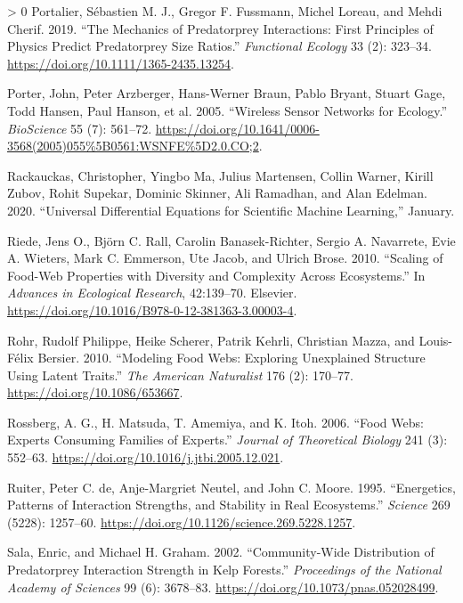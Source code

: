 \documentclass[10pt,oneside]{article}
\newlength{\cslhangindent}
\newenvironment{CSLReferences}[3] %
 {%
  \setlength{\parindent}{0pt}
  \ifodd #1 \everypar{\setlength{\hangindent}{\cslhangindent}}\ignorespaces\fi
  \ifnum #2 > 0
  \setlength{\parskip}{#2\baselineskip}
  \fi
 }%
 {}
\begin{document}
\begin{CSLReferences}{1}{0}
\leavevmode\hypertarget{ref-Portalier2019MecPre}{}%
Portalier, Sébastien M. J., Gregor F. Fussmann, Michel Loreau, and Mehdi
Cherif. 2019. {``The Mechanics of Predatorprey Interactions: First
Principles of Physics Predict Predatorprey Size Ratios.''}
\emph{Functional Ecology} 33 (2): 323--34.
\url{https://doi.org/10.1111/1365-2435.13254}.

\leavevmode\hypertarget{ref-Porter2005WirSen}{}%
Porter, John, Peter Arzberger, Hans-Werner Braun, Pablo Bryant, Stuart
Gage, Todd Hansen, Paul Hanson, et al. 2005. {``Wireless Sensor Networks
for Ecology.''} \emph{BioScience} 55 (7): 561--72.
\url{https://doi.org/10.1641/0006-3568(2005)055\%5B0561:WSNFE\%5D2.0.CO;2}.

\leavevmode\hypertarget{ref-Rackauckas2020UniDif}{}%
Rackauckas, Christopher, Yingbo Ma, Julius Martensen, Collin Warner,
Kirill Zubov, Rohit Supekar, Dominic Skinner, Ali Ramadhan, and Alan
Edelman. 2020. {``Universal Differential Equations for Scientific
Machine Learning,''} January.

\leavevmode\hypertarget{ref-Riede2010ScaFoo}{}%
Riede, Jens O., Björn C. Rall, Carolin Banasek-Richter, Sergio A.
Navarrete, Evie A. Wieters, Mark C. Emmerson, Ute Jacob, and Ulrich
Brose. 2010. {``Scaling of Food-Web Properties with Diversity and
Complexity Across Ecosystems.''} In \emph{Advances in Ecological
Research}, 42:139--70. Elsevier.
\url{https://doi.org/10.1016/B978-0-12-381363-3.00003-4}.

\leavevmode\hypertarget{ref-Rohr2010ModFoo}{}%
Rohr, Rudolf Philippe, Heike Scherer, Patrik Kehrli, Christian Mazza,
and Louis-Félix Bersier. 2010. {``Modeling Food Webs: Exploring
Unexplained Structure Using Latent Traits.''} \emph{The American
Naturalist} 176 (2): 170--77. \url{https://doi.org/10.1086/653667}.

\leavevmode\hypertarget{ref-Rossberg2006FooWeb}{}%
Rossberg, A. G., H. Matsuda, T. Amemiya, and K. Itoh. 2006. {``Food
Webs: Experts Consuming Families of Experts.''} \emph{Journal of
Theoretical Biology} 241 (3): 552--63.
\url{https://doi.org/10.1016/j.jtbi.2005.12.021}.

\leavevmode\hypertarget{ref-Ruiter1995EnePat}{}%
Ruiter, Peter C. de, Anje-Margriet Neutel, and John C. Moore. 1995.
{``Energetics, Patterns of Interaction Strengths, and Stability in Real
Ecosystems.''} \emph{Science} 269 (5228): 1257--60.
\url{https://doi.org/10.1126/science.269.5228.1257}.

\leavevmode\hypertarget{ref-Sala2002ComDis}{}%
Sala, Enric, and Michael H. Graham. 2002. {``Community-Wide Distribution
of Predatorprey Interaction Strength in Kelp Forests.''}
\emph{Proceedings of the National Academy of Sciences} 99 (6): 3678--83.
\url{https://doi.org/10.1073/pnas.052028499}.


\end{CSLReferences}
\end{document}
